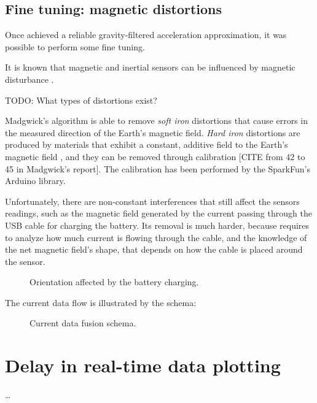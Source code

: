\subsection{Fine tuning: magnetic distortions}
Once achieved a reliable gravity-filtered acceleration approximation, it was possible to perform some fine tuning.

It is known that magnetic and inertial sensors can be influenced by magnetic disturbance \cite{Fan17}.

TODO: What types of distortions exist?

Madgwick's algorithm is able to remove \textit{soft iron} distortions \cite[11-12]{Mad10} that cause errors in the measured direction of the Earth's magnetic field. \textit{Hard iron} distortions are produced by materials that exhibit a constant, additive field to the Earth's magnetic field \cite{CompensatingIron}, and they can be removed through calibration \cite{CompensatingIron, Geb06, Kok12} [CITE from 42 to 45 in Madgwick's report]. The calibration has been performed by the SparkFun's Arduino library.
\bigbreak

Unfortunately, there are non-constant interferences that still affect the sensors readings, such as the magnetic field generated by the current passing through the USB cable for charging the battery.
Its removal is much harder, because requires to analyze how much current is flowing through the cable, and the knowledge of the net magnetic field's shape, that depends on how the cable is placed around the sensor.

\begin{center}
	\begin{figure}[ht]
		\caption{Orientation affected by the battery charging.}
	\end{figure}
\end{center}

The current data flow is illustrated by the schema:

\begin{center}
	\begin{figure}[ht]
		\caption{Current data fusion schema.}
	\end{figure}
\end{center}

\section{Delay in real-time data plotting}
\dots
